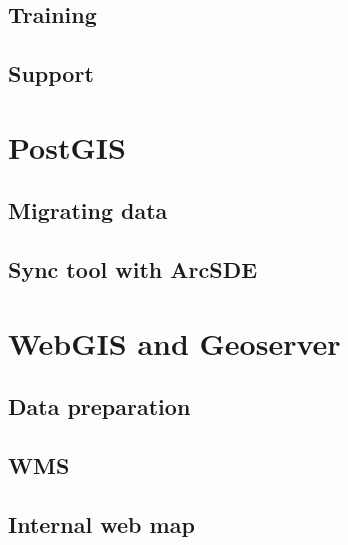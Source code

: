 \subsection{Training}


\subsection{Support}

\section{PostGIS}

\subsection{Migrating data}
\subsection{Sync tool with ArcSDE}

\section{WebGIS and Geoserver}
\subsection{Data preparation}
\subsection{WMS}
\subsection{Internal web map}

